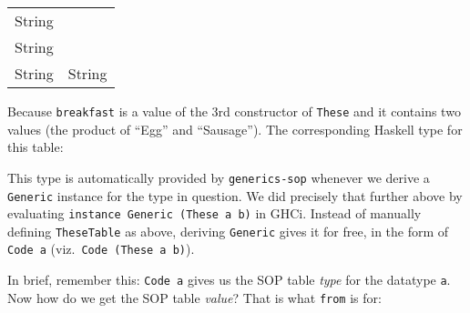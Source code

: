 \begin{longtable}[]{@{}ll@{}}
\toprule
\endhead
String & \\
String & \\
String & String \\
\bottomrule
\end{longtable}

Because \texttt{breakfast} is a value of the 3rd constructor of
\texttt{These} and it contains two values (the product of ``Egg'' and
``Sausage''). The corresponding Haskell type for this table:

\begin{Shaded}
\begin{Highlighting}[]
 \OtherTok{ ::}\NormalTok{ [[}\NormalTok{]]}
  \OtherTok{=}
\NormalTok{  \textquotesingle{}[ \textquotesingle{}[ }\NormalTok{ ]}
\NormalTok{     \textquotesingle{}[ }\NormalTok{ ]}
\NormalTok{     \textquotesingle{}[ }\NormalTok{, }\NormalTok{ ]}
\NormalTok{  ]}
\end{Highlighting}
\end{Shaded}

This type is automatically provided by \texttt{generics-sop} whenever we
derive a \texttt{Generic} instance for the type in question. We did
precisely that further above by evaluating
\texttt{instance\ Generic\ (These\ a\ b)} in GHCi. Instead of manually
defining \texttt{TheseTable} as above, deriving \texttt{Generic} gives
it for free, in the form of \texttt{Code\ a}
(viz.~\texttt{Code\ (These\ a\ b)}).

\begin{Shaded}
\begin{Highlighting}[]
\OperatorTok{\textgreater{}} \OperatorTok{:}\NormalTok{ (}  \NormalTok{)}
\NormalTok{ (}  \NormalTok{)}\OtherTok{ ::}\NormalTok{ [[}\NormalTok{]]}
\end{Highlighting}
\end{Shaded}

In brief, remember this: \texttt{Code\ a} gives us the SOP table
\emph{type} for the datatype \texttt{a}. Now how do we get the SOP table
\emph{value}? That is what \texttt{from} is for:

